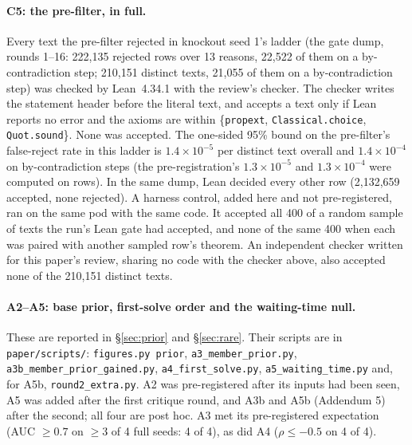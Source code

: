 \paragraph{C5: the pre-filter, in full.} Every text the pre-filter rejected in knockout seed 1's ladder (the gate dump,
rounds 1--16: 222,135 rejected rows over 13 reasons, 22,522 of them on a by-contradiction step; 210,151 distinct
texts, 21,055 of them on a by-contradiction step) was checked by Lean~4.34.1 with
the review's checker. The checker writes the statement header before the literal text, and accepts a text only if Lean
reports no error and the axioms are within \{\texttt{propext}, \texttt{Classical.choice}, \texttt{Quot.sound}\}. None
was accepted. The one-sided 95\% bound on the pre-filter's false-reject rate in this ladder is $1.4\times10^{-5}$ per
distinct text overall and $1.4\times10^{-4}$ on by-contradiction steps (the pre-registration's $1.3\times10^{-5}$ and
$1.3\times10^{-4}$ were computed on rows). In the same dump, Lean decided every other row
(2,132,659 accepted, none rejected). A harness control, added here and not pre-registered, ran on the same pod with the
same code. It accepted all 400 of a random sample of texts the run's Lean gate had accepted, and none of the same 400
when each was paired with another sampled row's theorem. An independent checker written for this paper's review,
sharing no code with the checker above, also accepted none of the 210,151 distinct texts.

\paragraph{A2--A5: base prior, first-solve order and the waiting-time null.} These are reported in \S\ref{sec:prior}
and \S\ref{sec:rare}. Their scripts are in \texttt{paper/scripts/}: \texttt{figures.py prior},
\texttt{a3\_member\_prior.py}, \texttt{a3b\_member\_prior\_gained.py}, \texttt{a4\_first\_solve.py},
\texttt{a5\_waiting\_time.py} and, for A5b, \texttt{round2\_extra.py}. A2 was pre-registered
after its inputs had been seen, A5 was added after the first critique round, and A3b and A5b (Addendum 5) after the
second; all four are post hoc. A3 met its
pre-registered expectation (AUC $\geq 0.7$ on $\geq 3$ of 4 full seeds: 4 of 4), as did A4 ($\rho \leq -0.5$ on 4 of 4).
